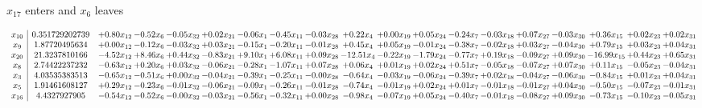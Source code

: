 \documentclass[9pt]{article}
\begin{document}
 $ x_{17} $ enters and $ x_{6} $ leaves 

 \[\begin{array}{c| c c@{\hskip 2pt} c@{\hskip 2pt} c@{\hskip 2pt} c@{\hskip 2pt} c@{\hskip 2pt} c@{\hskip 2pt} c@{\hskip 2pt} c@{\hskip 2pt} c@{\hskip 2pt} c@{\hskip 2pt} c@{\hskip 2pt} c@{\hskip 2pt} c@{\hskip 2pt} c@{\hskip 2pt} c@{\hskip 2pt} c@{\hskip 2pt} c@{\hskip 2pt} }
 x_{10}   &  0.351729202739 & +  0.80 x_{12} & -0.52 x_{6} & -0.05 x_{32} & +  0.02 x_{21} & -0.06 x_{1} & -0.45 x_{11} & -0.03 x_{28} & +  0.22 x_{4} & +  0.00 x_{19} & +  0.05 x_{24} & -0.24 x_{7} & -0.03 x_{18} & +  0.07 x_{27} & -0.03 x_{30} & +  0.36 x_{15} & +  0.02 x_{23} & +  0.02 x_{31}\\
 x_{9}   &  1.87720495634 & +  0.00 x_{12} & -0.12 x_{6} & -0.03 x_{32} & +  0.03 x_{21} & -0.15 x_{1} & -0.20 x_{11} & -0.01 x_{28} & +  0.45 x_{4} & +  0.05 x_{19} & -0.01 x_{24} & -0.38 x_{7} & -0.02 x_{18} & +  0.03 x_{27} & -0.04 x_{30} & +  0.79 x_{15} & +  0.03 x_{23} & +  0.04 x_{31}\\
 x_{20}   &  21.3237810166 & -4.52 x_{12} & +  8.46 x_{6} & +  0.44 x_{32} & -0.83 x_{21} & +  9.10 x_{1} & +  6.08 x_{11} & +  0.09 x_{28} & -12.51 x_{4} & -0.22 x_{19} & -1.79 x_{24} & -0.77 x_{7} & +  0.19 x_{18} & -0.09 x_{27} & +  0.09 x_{30} & -16.99 x_{15} & +  0.44 x_{23} & +  0.65 x_{31}\\
 x_{8}   &  2.74422237232 & -0.63 x_{12} & +  0.20 x_{6} & +  0.03 x_{32} & -0.06 x_{21} & -0.28 x_{1} & -1.07 x_{11} & +  0.07 x_{28} & +  0.06 x_{4} & +  0.01 x_{19} & +  0.02 x_{24} & +  0.51 x_{7} & -0.05 x_{18} & -0.07 x_{27} & +  0.07 x_{30} & +  0.11 x_{15} & -0.05 x_{23} & -0.04 x_{31}\\
 x_{3}   &  4.03535383513 & -0.65 x_{12} & -0.51 x_{6} & +  0.00 x_{32} & -0.04 x_{21} & -0.39 x_{1} & -0.25 x_{11} & -0.00 x_{28} & -0.64 x_{4} & -0.03 x_{19} & -0.06 x_{24} & -0.39 x_{7} & +  0.02 x_{18} & -0.04 x_{27} & -0.06 x_{30} & -0.84 x_{15} & +  0.01 x_{23} & +  0.04 x_{31}\\
 x_{5}   &  1.91461608127 & +  0.29 x_{12} & -0.23 x_{6} & -0.01 x_{32} & -0.06 x_{21} & -0.09 x_{1} & -0.26 x_{11} & -0.01 x_{28} & -0.74 x_{4} & -0.01 x_{19} & +  0.02 x_{24} & +  0.01 x_{7} & -0.01 x_{18} & -0.01 x_{27} & +  0.04 x_{30} & -0.50 x_{15} & -0.07 x_{23} & -0.01 x_{31}\\
 x_{16}   &  4.4327927905 & -0.54 x_{12} & -0.52 x_{6} & -0.00 x_{32} & -0.03 x_{21} & -0.56 x_{1} & -0.32 x_{11} & +  0.00 x_{28} & -0.98 x_{4} & -0.07 x_{19} & +  0.05 x_{24} & -0.40 x_{7} & -0.01 x_{18} & -0.08 x_{27} & +  0.09 x_{30} & -0.73 x_{15} & -0.10 x_{23} & -0.05 x_{31}\\

\end{array}\]
\end{document}
